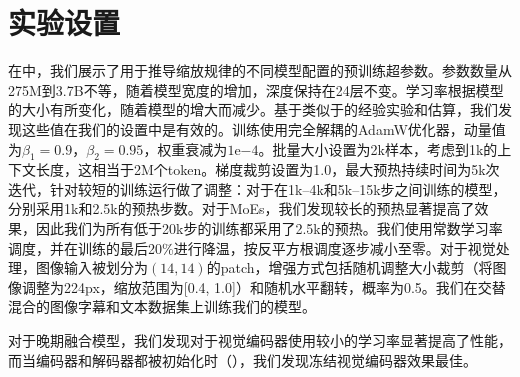 \section{实验设置}
\label{app:implementation_details}

在中，我们展示了用于推导缩放规律的不同模型配置的预训练超参数。参数数量从275M到3.7B不等，随着模型宽度的增加，深度保持在24层不变。学习率根据模型的大小有所变化，随着模型的增大而减少。基于类似于\citep{mckinzie2025mm1}的经验实验和估算，我们发现这些值在我们的设置中是有效的。训练使用完全解耦的AdamW优化器，动量值为$\beta_1=0.9$，$\beta_2=0.95$，权重衰减为$1\text{e}{-4}$。批量大小设置为2k样本，考虑到1k的上下文长度，这相当于2M个token。梯度裁剪设置为1.0，最大预热持续时间为5k次迭代，针对较短的训练运行做了调整：对于在1k–4k和5k–15k步之间训练的模型，分别采用1k和2.5k的预热步数。对于MoEs，我们发现较长的预热显著提高了效果，因此我们为所有低于20k步的训练都采用了2.5k的预热。我们使用常数学习率调度，并在训练的最后20\%进行降温，按反平方根调度逐步减小至零。对于视觉处理，图像输入被划分为$(14,14)$的patch，增强方式包括随机调整大小裁剪（将图像调整为224px，缩放范围为[0.4, 1.0]）和随机水平翻转，概率为0.5。我们在交替混合的图像字幕和文本数据集上训练我们的模型。

对于晚期融合模型，我们发现对于视觉编码器使用较小的学习率显著提高了性能，而当编码器和解码器都被初始化时（），我们发现冻结视觉编码器效果最佳。

